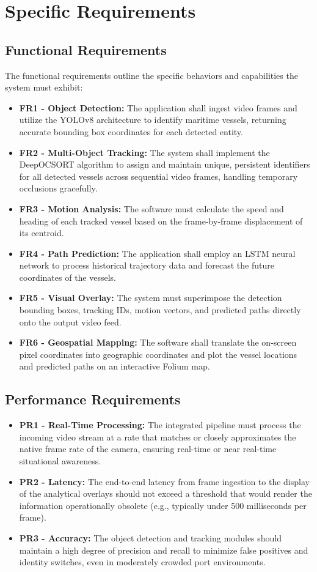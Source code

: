 \section{Specific Requirements}

\subsection{Functional Requirements}
The functional requirements outline the specific behaviors and capabilities the system must exhibit:
\begin{itemize}
    \item \textbf{FR1 - Object Detection:} The application shall ingest video frames and utilize the YOLOv8 architecture to identify maritime vessels, returning accurate bounding box coordinates for each detected entity.
    \item \textbf{FR2 - Multi-Object Tracking:} The system shall implement the DeepOCSORT algorithm to assign and maintain unique, persistent identifiers for all detected vessels across sequential video frames, handling temporary occlusions gracefully.
    \item \textbf{FR3 - Motion Analysis:} The software must calculate the speed and heading of each tracked vessel based on the frame-by-frame displacement of its centroid.
    \item \textbf{FR4 - Path Prediction:} The application shall employ an LSTM neural network to process historical trajectory data and forecast the future coordinates of the vessels.
    \item \textbf{FR5 - Visual Overlay:} The system must superimpose the detection bounding boxes, tracking IDs, motion vectors, and predicted paths directly onto the output video feed.
    \item \textbf{FR6 - Geospatial Mapping:} The software shall translate the on-screen pixel coordinates into geographic coordinates and plot the vessel locations and predicted paths on an interactive Folium map.
\end{itemize}

\subsection{Performance Requirements}
\begin{itemize}
    \item \textbf{PR1 - Real-Time Processing:} The integrated pipeline must process the incoming video stream at a rate that matches or closely approximates the native frame rate of the camera, ensuring real-time or near real-time situational awareness.
    \item \textbf{PR2 - Latency:} The end-to-end latency from frame ingestion to the display of the analytical overlays should not exceed a threshold that would render the information operationally obsolete (e.g., typically under 500 milliseconds per frame).
    \item \textbf{PR3 - Accuracy:} The object detection and tracking modules should maintain a high degree of precision and recall to minimize false positives and identity switches, even in moderately crowded port environments.
\end{itemize}

